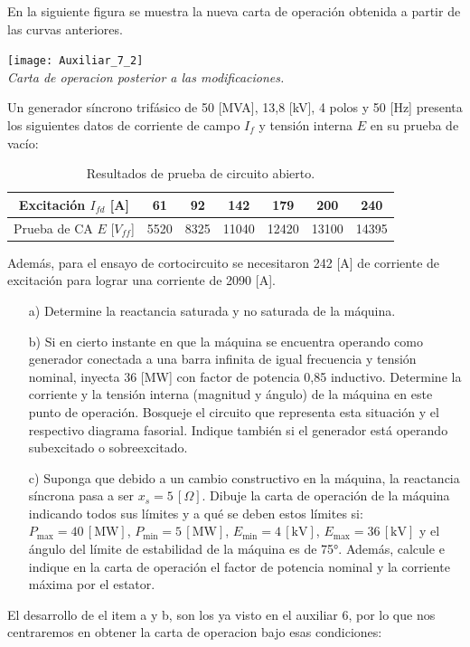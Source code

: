 \documentclass[
  11pt,
  letterpaper,
   addpoints,
   answers
  ]{exam}
\begin{document}
\begin{questions}
\begin{solution}
        En la siguiente figura se muestra la nueva carta de operación obtenida a partir de las curvas anteriores.
        \begin{center}
            \texttt{[image: Auxiliar\_7\_2]} \\
            \textit{Carta de operacion posterior a las modificaciones.}
        \end{center}
    \end{solution}
    \question Un generador síncrono trifásico de 50 [MVA], 13,8 [kV], 4 polos y 50 [Hz] presenta los siguientes datos de corriente de campo \( I_f \) y tensión interna \( E \) en su prueba de vacío:

    \begin{table}[h!]
        \centering
        \caption{Resultados de prueba de circuito abierto.}
        \begin{tabular}{|c|c|c|c|c|c|c|}
            \hline
            Excitación \( I_{fd} \) [A] & 61 & 92 & 142 & 179 & 200 & 240 \\
            \hline
            Prueba de CA \( E \) [$V_{ff}$] & 5520 & 8325 & 11040 & 12420 & 13100 & 14395 \\
            \hline
        \end{tabular}
    \end{table}
    
    Además, para el ensayo de cortocircuito se necesitaron 242 [A] de corriente de excitación para lograr una corriente de 2090 [A].
    
    \begin{enumerate}
        \item[a)] Determine la reactancia saturada y no saturada de la máquina.
    
        \item[b)] Si en cierto instante en que la máquina se encuentra operando como generador conectada a una barra infinita de igual frecuencia y tensión nominal, inyecta 36 [MW] con factor de potencia 0,85 inductivo. Determine la corriente y la tensión interna (magnitud y ángulo) de la máquina en este punto de operación. Bosqueje el circuito que representa esta situación y el respectivo diagrama fasorial. Indique también si el generador está operando subexcitado o sobreexcitado.
    
        \item[c)] Suponga que debido a un cambio constructivo en la máquina, la reactancia síncrona pasa a ser \( x_s = 5 \, [\Omega] \). Dibuje la carta de operación de la máquina indicando todos sus límites y a qué se deben estos límites si: \( P_{\text{max}} = 40 \, [\text{MW}] \), \( P_{\text{min}} = 5 \, [\text{MW}] \), \( E_{\text{min}} = 4 \, [\text{kV}] \), \( E_{\text{max}} = 36 \, [\text{kV}] \) y el ángulo del límite de estabilidad de la máquina es de 75°. Además, calcule e indique en la carta de operación el factor de potencia nominal y la corriente máxima por el estator.
    \end{enumerate}
\begin{solution}
El desarrollo de el item a y b, son los ya visto en el auxiliar 6, por lo que nos centraremos en obtener la carta de operacion bajo esas condiciones:

\end{solution}
\end{questions}
\end{document}
